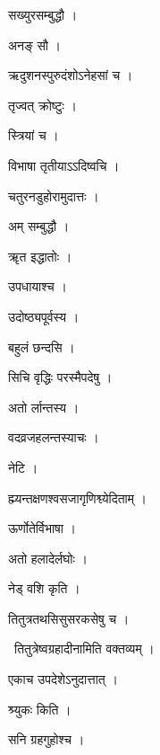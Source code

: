\documentclass[10pt, openany, oneside]{book}
\begin{document}
\noindent सख्युरसम्बुद्धौ ।

\noindent अनङ् सौ ।

\noindent ऋदुशनस्पुरुदंशोऽनेहसां च ।

\noindent तृज्वत् क्रोष्टुः ।

\noindent स्त्रियां च ।

\noindent विभाषा तृतीयाऽऽदिष्वचि ।

\noindent चतुरनडुहोरामुदात्तः ।

\noindent अम् सम्बुद्धौ ।

\noindent ॠत इद्धातोः ।

\noindent उपधायाश्च ।

\noindent उदोष्ठ्यपूर्वस्य ।

\noindent बहुलं छन्दसि ।

\noindent सिचि वृद्धिः परस्मैपदेषु ।

\noindent अतो र्लान्तस्य ।

\noindent वदव्रजहलन्तस्याचः ।

\noindent नेटि ।

\noindent ह्म्यन्तक्षणश्वसजागृणिश्व्येदिताम् ।

\noindent ऊर्णोतेर्विभाषा ।

\noindent अतो हलादेर्लघोः ।

\noindent नेड् वशि कृति ।

\noindent तितुत्रतथसिसुसरकसेषु च ।

\par\noindent\hspace{1.5em}{\vps वा॰}~{\qt तितुत्रेष्वग्रहादीनामिति वक्तव्यम् ।}

\noindent एकाच उपदेशेऽनुदात्तात् ।

\noindent श्र्युकः किति ।

\noindent सनि ग्रहगुहोश्च ।
\end{document}
